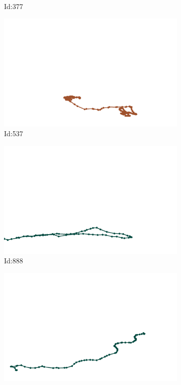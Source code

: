 \documentclass[12pt,twoside]{report}
\begin{document}
\begin{figure}
\begin{subfigure}[b]{0.20\textwidth}
\caption{Id:377}
\end{subfigure}
\begin{subfigure}[b]{0.20\textwidth}
\centering
\includegraphics[width=\textwidth]{../trajectories/537.png}
\caption{Id:537}
\end{subfigure}
\begin{subfigure}[b]{0.20\textwidth}
\centering
\includegraphics[width=\textwidth]{../trajectories/888.png}
\caption{Id:888}
\end{subfigure}
\begin{subfigure}[b]{0.20\textwidth}
\centering
\includegraphics[width=\textwidth]{../trajectories/930.png}

\end{subfigure}
\end{figure}
\end{document}
